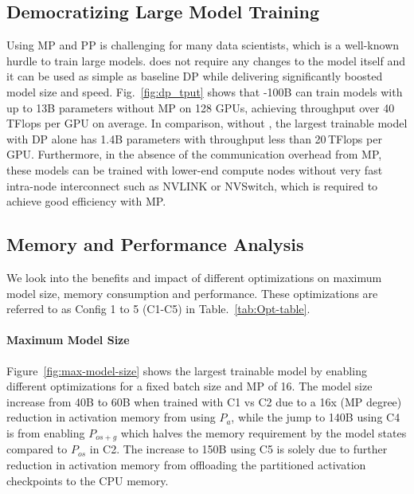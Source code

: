 \subsection{Democratizing Large Model Training}
Using MP and PP is challenging for many data scientists, which is a well-known hurdle to train large models.  \name does not require any changes to the model itself and it can be used as simple as baseline DP while delivering significantly boosted model size and speed.  Fig.~\ref{fig:dp_tput} shows that \name-100B can train models with up to 13B parameters without MP on 128 GPUs, achieving throughput over 40\,TFlops per GPU on average. In comparison, without \name, the largest trainable model with DP alone has 1.4B parameters with throughput less than 20\,TFlops per GPU. 
Furthermore, in the absence of the communication overhead from MP, these models can be trained with lower-end compute nodes without very fast intra-node interconnect such as NVLINK or NVSwitch, which is required to achieve good efficiency with MP.  


\subsection{Memory and Performance Analysis}
We look into the benefits and impact of different optimizations on maximum model size, memory consumption and performance. These optimizations are referred to as Config 1 to 5 (C1-C5) in Table.~\ref{tab:Opt-table}.

\paragraph{Maximum Model Size}
Figure~\ref{fig:max-model-size} shows the largest trainable model by enabling different \name optimizations for a fixed batch size and MP of 16. The model size increase from 40B to 60B when trained with C1 vs C2  due to a 16x (MP degree) reduction in activation memory from using $P_a$, while the jump to 140B using C4 is from enabling $P_{os+g}$ which halves the memory requirement by the model states compared to $P_{os}$ in C2. The increase to 150B using C5 is solely due to further reduction in activation memory from offloading the partitioned activation checkpoints to the CPU memory.
